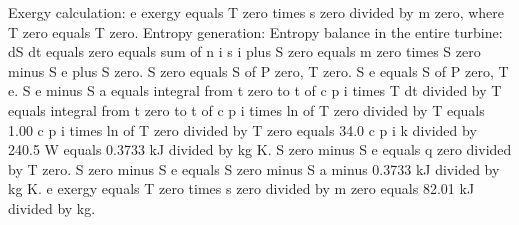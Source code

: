 Exergy calculation:  
e exergy equals T zero times s zero divided by m zero, where T zero equals T zero.  
Entropy generation:  
Entropy balance in the entire turbine:  
dS dt equals zero equals sum of n i s i plus S zero equals m zero times S zero minus S e plus S zero.  
S zero equals S of P zero, T zero.  
S e equals S of P zero, T e.  
S e minus S a equals integral from t zero to t of c p i times T dt divided by T equals integral from t zero to t of c p i times ln of T zero divided by T equals 1.00 c p i times ln of T zero divided by T zero equals 34.0 c p i k divided by 240.5 W equals 0.3733 kJ divided by kg K.  
S zero minus S e equals q zero divided by T zero.  
S zero minus S e equals S zero minus S a minus 0.3733 kJ divided by kg K.  
e exergy equals T zero times s zero divided by m zero equals 82.01 kJ divided by kg.